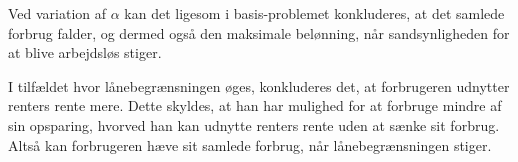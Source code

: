 Ved variation af $\alpha$ kan det ligesom i basis-problemet konkluderes, at det samlede forbrug falder, og dermed også den maksimale belønning, når sandsynligheden for at blive arbejdsløs stiger. 

I tilfældet hvor lånebegrænsningen øges, konkluderes det, at forbrugeren udnytter renters rente mere. Dette skyldes, at han har mulighed for at forbruge mindre af sin opsparing, hvorved han kan udnytte renters rente uden at sænke sit forbrug. Altså kan forbrugeren hæve sit samlede forbrug, når lånebegrænsningen stiger. 


